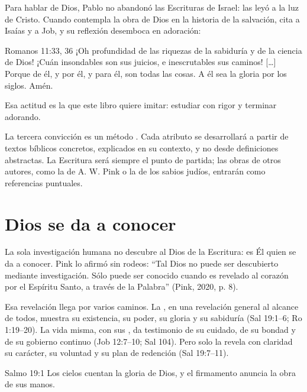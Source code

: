 Para hablar de Dios, Pablo no abandonó las Escrituras de Israel: las leyó a la luz de Cristo. Cuando contempla la obra de Dios en la historia de la salvación, cita a Isaías y a Job, y su reflexión desemboca en adoración:

\begin{verso}{Romanos 11:33, 36}
¡Oh profundidad de las riquezas de la sabiduría y de la ciencia de Dios! ¡Cuán insondables son sus juicios, e inescrutables sus caminos! […] Porque de él, y por él, y para él, son todas las cosas. A él sea la gloria por los siglos. Amén.
\end{verso}

Esa actitud es la que este libro quiere imitar: estudiar con rigor y terminar adorando.

La tercera convicción es un método . Cada atributo se desarrollará a partir de textos bíblicos concretos, explicados en su contexto, y no desde definiciones abstractas. La Escritura será siempre el punto de partida; las obras de otros autores, como la de A. W. Pink o la de los sabios judíos, entrarán como referencias puntuales.


\section{Dios se da a conocer}

La sola investigación humana no descubre al Dios de la Escritura: es Él quien se da a conocer. Pink lo afirmó sin rodeos: “Tal Dios no puede ser descubierto mediante investigación. Sólo puede ser conocido cuando es revelado al corazón por el Espíritu Santo, a través de la Palabra” (Pink, 2020, p. 8).

Esa revelación llega por varios caminos. La , en una revelación general al alcance de todos, muestra su existencia, su poder, su gloria y su sabiduría (Sal 19:1–6; Ro 1:19–20). La vida misma, con sus , da testimonio de su cuidado, de su bondad y de su gobierno continuo (Job 12:7–10; Sal 104). Pero solo la  revela con claridad su carácter, su voluntad y su plan de redención (Sal 19:7–11).

\begin{verso}{Salmo 19:1}
Los cielos cuentan la gloria de Dios, y el firmamento anuncia la obra de sus manos.
\end{verso}

